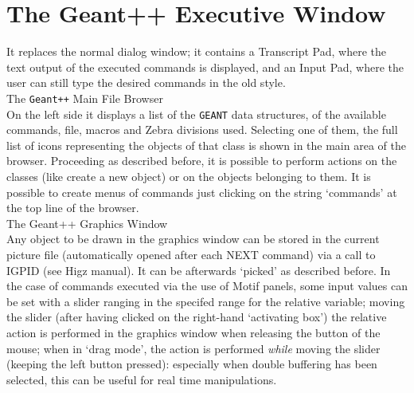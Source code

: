 \section {The Geant++ Executive Window}
It replaces the normal dialog window; it contains a Transcript Pad, where the
text output of the executed commands is displayed, and an Input Pad, where the
user can still type the desired commands in the old style. \\[1em]
The {\tt Geant++} Main File Browser \\[1em]
On the left side it displays a list of the {\tt GEANT} data structures, of the 
available commands, file, macros and Zebra divisions used. Selecting one of
them, the full list of icons representing the objects of that class is shown
in the main area of the browser. Proceeding as described before, it is 
possible to perform actions on the classes (like create a new object) or on
the objects belonging to them. It is possible to create menus of commands
just clicking on the string `commands' at the top line of the browser. \\[1em]
The Geant++ Graphics Window \\[1em]
Any object to be drawn in the graphics window can be stored in the current
picture file (automatically opened after each NEXT command) via a call to 
IGPID (see Higz manual). It can be afterwards `picked' as described before.
In the case of commands executed via the use of Motif panels, some input values
can be set with a slider ranging in the specifed range for the relative
variable; moving the slider (after having clicked on the right-hand `activating
box') the relative action is performed in the graphics
window when releasing the button of the mouse; when in `drag mode', the 
action is performed {\it while} moving the slider (keeping the left button
pressed): especially when double buffering has been selected, this can be
useful for real time manipulations.\\[1em]
